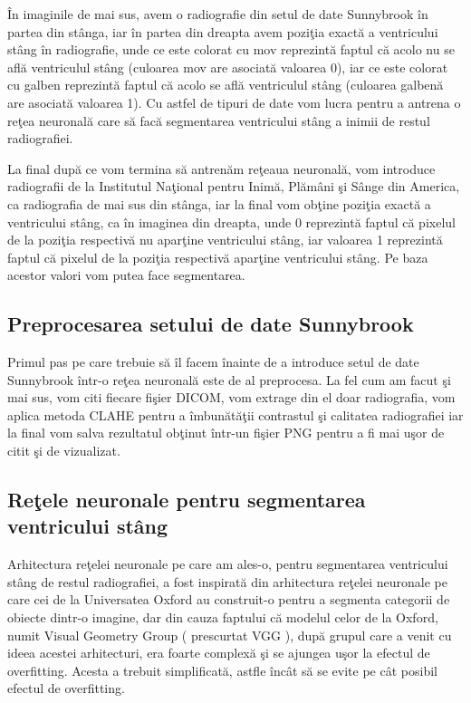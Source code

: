 \^{I}n imaginile de mai sus, avem o radiografie din setul de date Sunnybrook \^{i}n partea din st\^{a}nga, iar \^{i}n partea din dreapta avem pozi\c{t}ia exact\u{a} a ventricului st\^{a}ng \^{i}n radiografie, unde ce este colorat cu mov reprezint\u{a} faptul c\u{a} acolo nu se afl\u{a} ventriculul st\^{a}ng (culoarea mov are asociat\u{a} valoarea 0), iar ce este colorat cu galben reprezint\u{a} faptul c\u{a} acolo se afl\u{a} ventriculul st\^{a}ng (culoarea galben\u{a} are asociat\u{a} valoarea 1). Cu astfel de tipuri de date vom lucra pentru a antrena o re\c{t}ea neuronal\u{a} care s\u{a} fac\u{a} segmentarea ventricului st\^{a}ng a inimii de restul radiografiei. 

\par

La final dup\u{a} ce vom termina s\u{a} antren\u{a}m re\c{t}eaua neuronal\u{a}, vom introduce radiografii de la Institutul Na\c{t}ional pentru Inim\u{a}, Pl\u{a}m\^{a}ni \c{s}i S\^{a}nge din America, ca radiografia de mai sus din st\^{a}nga, iar la final vom ob\c{t}ine pozi\c{t}ia exact\u{a} a ventricului st\^{a}ng, ca \^{i}n imaginea din dreapta, unde 0 reprezint\u{a} faptul c\u{a} pixelul de la pozi\c{t}ia respectiv\u{a} nu apar\c{t}ine ventricului st\^{a}ng, iar valoarea 1 reprezint\u{a} faptul c\u{a} pixelul de la pozi\c{t}ia respectiv\u{a} apar\c{t}ine ventricului st\^{a}ng. Pe baza acestor valori vom putea face segmentarea.

\subsection{Preprocesarea setului de date Sunnybrook}

Primul pas pe care trebuie s\u{a} \^{i}l facem \^{i}nainte de a introduce setul de date Sunnybrook \^{i}ntr-o re\c{t}ea neuronal\u{a} este de al preprocesa. La fel cum am facut \c{s}i mai sus, vom citi fiecare fi\c{s}ier DICOM, vom extrage din el doar radiografia, vom aplica metoda CLAHE pentru a \^{i}mbun\u{a}t\u{a}\c{t}ii contrastul \c{s}i calitatea radiografiei iar la final vom salva rezultatul ob\c{t}inut \^{i}ntr-un fi\c{s}ier PNG pentru a fi mai u\c{s}or de citit \c{s}i de vizualizat.

\subsection{Re\c{t}ele neuronale pentru segmentarea ventricului st\^{a}ng}

Arhitectura re\c{t}elei neuronale pe care am ales-o, pentru segmentarea ventricului st\^{a}ng de restul radiografiei, a fost inspirat\u{a} din arhitectura re\c{t}elei neuronale pe care cei de la Universatea Oxford au construit-o pentru a segmenta categorii de obiecte dintr-o imagine, dar din cauza faptului c\u{a} modelul celor de la Oxford, numit Visual Geometry Group ( prescurtat VGG ), dup\u{a} grupul care a venit cu ideea acestei arhitecturi, era foarte complex\u{a} \c{s}i se ajungea u\c{s}or la efectul de overfitting. Acesta a trebuit simplificat\u{a,} astfle \^{i}nc\^{a}t s\u{a} se evite pe c\^{a}t posibil efectul de overfitting.

